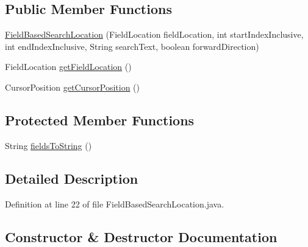 \subsection*{Public Member Functions}
\begin{DoxyCompactItemize}
\item 
\mbox{\hyperlink{classghidra_1_1app_1_1plugin_1_1core_1_1decompile_1_1actions_1_1_field_based_search_location_a48fbd3d45ace861bae56e24b5449ad4c}{Field\+Based\+Search\+Location}} (Field\+Location field\+Location, int start\+Index\+Inclusive, int end\+Index\+Inclusive, String search\+Text, boolean forward\+Direction)
\item 
Field\+Location \mbox{\hyperlink{classghidra_1_1app_1_1plugin_1_1core_1_1decompile_1_1actions_1_1_field_based_search_location_ab401f7bac300aefb1cf7ded0805dbd66}{get\+Field\+Location}} ()
\item 
Cursor\+Position \mbox{\hyperlink{classghidra_1_1app_1_1plugin_1_1core_1_1decompile_1_1actions_1_1_field_based_search_location_add5cc4ea3863749f3eb95341cb2ff4a4}{get\+Cursor\+Position}} ()
\end{DoxyCompactItemize}
\subsection*{Protected Member Functions}
\begin{DoxyCompactItemize}
\item 
String \mbox{\hyperlink{classghidra_1_1app_1_1plugin_1_1core_1_1decompile_1_1actions_1_1_field_based_search_location_a526c8c61e62abae015cbd17d637d17f4}{fields\+To\+String}} ()
\end{DoxyCompactItemize}


\subsection{Detailed Description}


Definition at line 22 of file Field\+Based\+Search\+Location.\+java.



\subsection{Constructor \& Destructor Documentation}
\mbox{\label{classghidra_1_1app_1_1plugin_1_1core_1_1decompile_1_1actions_1_1_field_based_search_location_a48fbd3d45ace861bae56e24b5449ad4c}} 
